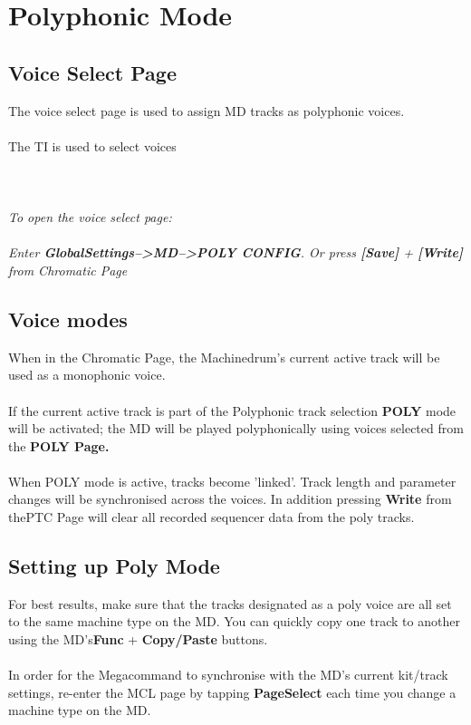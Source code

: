 \chapter{Polyphonic Mode}

\section{Voice Select Page}
The voice select page is used to assign MD tracks as polyphonic voices.\\\\
The TI is used to select voices\\\\
\\\\
\textit{To open the voice select page:\\\\
Enter \textbf{GlobalSettings-->MD-->POLY CONFIG}. Or press \textbf{[Save]} + \textbf{[Write]} from  Chromatic Page}
\section{Voice modes}

When in the Chromatic Page, the Machinedrum's current active track will be used as a monophonic voice.\\
\\
If the current active track is part of the Polyphonic track selection \textbf{POLY} mode will be activated; the MD will be played polyphonically using voices selected from the \textbf{POLY Page.}\\
\\
When POLY mode is active, tracks become 'linked'. Track length and parameter changes will be synchronised across the voices. In addition pressing \textbf{Write} from thePTC Page will clear all recorded sequencer data from the poly tracks.
\section{Setting up Poly Mode}
For best results, make sure that the tracks designated as a poly voice are all set to the same machine type on the MD. You can quickly copy one track to another using the MD's\textbf{Func} + \textbf{Copy/Paste} buttons.\\\\
In order for the Megacommand to synchronise with the MD's current kit/track settings, re-enter the MCL page by tapping \textbf{PageSelect} each time you change a machine type on the MD.
\newpage
